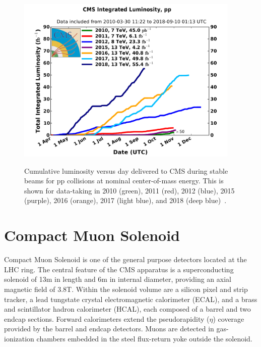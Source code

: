 \begin{figure}[!ht]
  \begin{center}
    \includegraphics[width=0.95\textwidth]{Fig/int_lumi_cumulative_pp_2}\\
    \caption{Cumulative luminosity versus day delivered to CMS during stable beams for pp collisions at nominal center-of-mass energy. This is shown for data-taking in 2010 (green), 2011 (red), 2012 (blue), 2015 (purple), 2016 (orange), 2017 (light blue), and 2018 (deep blue)~\cite{CMSLUMI}. \label{fig:IntegratedLumi}}
  \end{center}
\end{figure}

\section{Compact Muon Solenoid}
Compact Muon Solenoid is one of the general purpose detectors located at the LHC ring. 
The central feature of the CMS apparatus is a superconducting solenoid of 13\unit{m} in length and 6\unit{m} in internal diameter, providing an axial magnetic field of 3.8\unit{T}. Within the solenoid volume are a silicon pixel and strip tracker, a lead tungstate crystal electromagnetic calorimeter (ECAL), and a brass and scintillator hadron calorimeter (HCAL), each composed of a barrel and two endcap sections. Forward calorimeters extend the pseudorapidity ($\eta$) coverage provided by the barrel and endcap detectors. Muons are detected in gas-ionization chambers embedded in the steel flux-return yoke outside the solenoid. 

